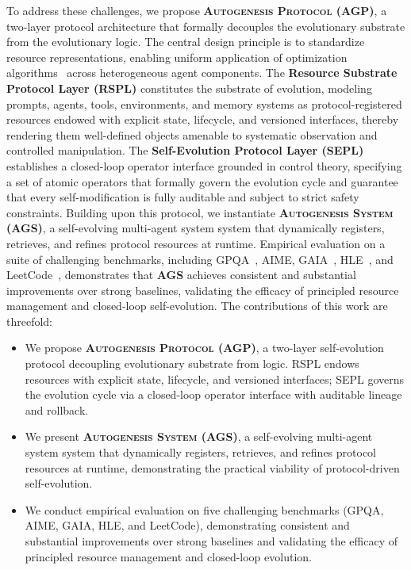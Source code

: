 \documentclass{article}
\theoremstyle{plain}
\theoremstyle{definition}
\theoremstyle{remark}
\newcommand{\projectnameAgent}{\textbf{\textsc{AGS}}\xspace}
\begin{document}
To address these challenges, we propose \textbf{\textsc{Autogenesis Protocol (AGP)}}, a two-layer protocol architecture that formally decouples the evolutionary substrate from the evolutionary logic. The central design principle is to standardize resource representations, enabling uniform application of optimization algorithms~\cite{yuksekgonul2025optimizing, shao2024deepseekmath, hu2025reinforce++} across heterogeneous agent components. The \textbf{Resource Substrate Protocol Layer (RSPL)} constitutes the substrate of evolution, modeling prompts, agents, tools, environments, and memory systems as protocol-registered resources endowed with explicit state, lifecycle, and versioned interfaces, thereby rendering them well-defined objects amenable to systematic observation and controlled manipulation. The \textbf{Self-Evolution Protocol Layer (SEPL)} establishes a closed-loop operator interface grounded in control theory, specifying a set of atomic operators that formally govern the evolution cycle and guarantee that every self-modification is fully auditable and subject to strict safety constraints. Building upon this protocol, we instantiate \textbf{\textsc{Autogenesis System (AGS)}}, a self-evolving multi-agent system system that dynamically registers, retrieves, and refines protocol resources at runtime. Empirical evaluation on a suite of challenging benchmarks, including GPQA~\cite{rein2024gpqa}, AIME, GAIA~\cite{mialon2023gaia}, HLE~\citep{phan2025humanity}, and LeetCode~\cite{leetcode2025}, demonstrates that \projectnameAgent achieves consistent and substantial improvements over strong baselines, validating the efficacy of principled resource management and closed-loop self-evolution. The contributions of this work are threefold:
\begin{itemize}[leftmargin=*,nosep]
    \item We propose \textbf{\textsc{Autogenesis Protocol (AGP)}}, a two-layer self-evolution protocol decoupling evolutionary substrate from logic. RSPL endows resources with explicit state, lifecycle, and versioned interfaces; SEPL governs the evolution cycle via a closed-loop operator interface with auditable lineage and rollback.
    \item We present \textbf{\textsc{Autogenesis System (AGS)}}, a self-evolving multi-agent system system that dynamically registers, retrieves, and refines protocol resources at runtime, demonstrating the practical viability of protocol-driven self-evolution.
    \item We conduct empirical evaluation on five challenging benchmarks (GPQA, AIME, GAIA, HLE, and LeetCode), demonstrating consistent and substantial improvements over strong baselines and validating the efficacy of principled resource management and closed-loop evolution.
\end{itemize}
\end{document}
